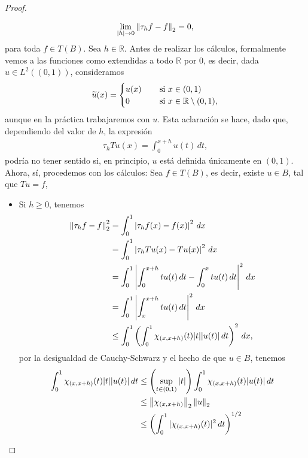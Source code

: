 \begin{proof}
\begin{enumerate}
\begin{align*}
            \lim_{|h|\to 0}\left\|\tau_h f-f\right\|_2=0,
        \end{align*}
        para toda $f \in T(B)$. Sea $h\in \mathbb{R}$. Antes de realizar los cálculos, formalmente vemos a las funciones como extendidas a todo $\mathbb{R}$ por $0$, es decir, dada $u \in L^2((0,1))$, consideramos
        \begin{align*}
            \widetilde{u}(x)=\begin{cases}
                u(x) \hspace{3mm} &\text{ si } x \in (0,1)\\
                0 &\text{ si } x \in \mathbb{R}\setminus (0,1),
            \end{cases}
        \end{align*}
        aunque en la práctica trabajaremos con $u$. Esta aclaración se hace, dado que, dependiendo del valor de $h$, la expresión
        \begin{align*}
            \tau_hTu(x)=\int_0^{x+h}u(t)\, dt,
        \end{align*}
        podría no tener sentido si, en principio, $u$ está definida únicamente en $(0,1)$. Ahora, sí, procedemos con los cálculos: Sea $f \in T(B)$, es decir, existe $u \in B$, tal que $Tu=f$, 
        \begin{itemize}
            \item Si $h\geq 0$, tenemos
            \begin{align*}
                \left\|\tau_h f-f\right\|_2^2&=\int_0^1 \left|\tau_h f(x)-f(x)\right|^2\, dx\\
                &=\int_0^1\left|\tau_h Tu(x)-Tu(x)\right|^2\, dx\\
                &=\int_0^1 \left|\int_0^{x+h}tu(t)\, dt-\int_0^x tu(t)\, dt\right|^2\, dx\\
                &=\int_0^1\left|\int_x^{x+h}tu(t)\, dt\right|^2\, dx\\
                &\leq \int_0^1 \left(\int_0^1 \chi_{(x,x+h)}(t)|t||u(t)|\, dt\right)^2\, dx,
            \end{align*}
            por la desigualdad de Cauchy-Schwarz y el hecho de que $u \in B$, tenemos 
            \begin{align*}
                \int_0^1 \chi_{(x,x+h)}(t)|t||u(t)|\, dt&\leq \left(\sup_{t\in (0,1)}|t|\right)\int_0^1 \chi_{(x,x+h)}(t)|u(t)|\, dt\\
                &\leq \norm{\chi_{(x,x+h)}}_2\norm{u}_2\\
                &\leq\left(\int_0^1 |\chi_{(x,x+h)}(t)|^2\, dt\right)^{1/2}\\

\end{align*}
\end{itemize}
\end{enumerate}
\end{proof}
